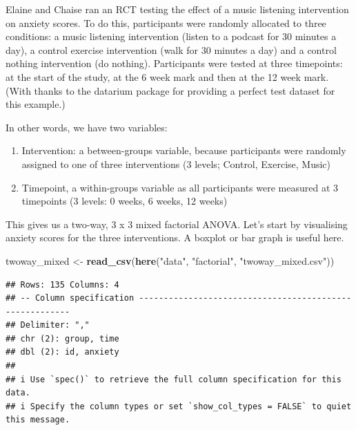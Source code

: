 \documentclass[
]{book}
\newenvironment{Shaded}{\begin{snugshade}}{\end{snugshade}}
\newcommand{\FunctionTok}[1]{\textcolor[rgb]{0.13,0.29,0.53}{\textbf{#1}}}
\newcommand{\NormalTok}[1]{#1}
\newcommand{\OtherTok}[1]{\textcolor[rgb]{0.56,0.35,0.01}{#1}}
\newcommand{\StringTok}[1]{\textcolor[rgb]{0.31,0.60,0.02}{#1}}
\providecommand{\tightlist}{%
  \setlength{\itemsep}{0pt}\setlength{\parskip}{0pt}}
\begin{document}
Elaine and Chaise ran an RCT testing the effect of a music listening intervention on anxiety scores. To do this, participants were randomly allocated to three conditions: a music listening intervention (listen to a podcast for 30 minutes a day), a control exercise intervention (walk for 30 minutes a day) and a control nothing intervention (do nothing). Participants were tested at three timepoints: at the start of the study, at the 6 week mark and then at the 12 week mark. (With thanks to the datarium package for providing a perfect test dataset for this example.)

In other words, we have two variables:

\begin{enumerate}
\def\labelenumi{\arabic{enumi}.}
\tightlist
\item
  Intervention: a between-groups variable, because participants were randomly assigned to one of three interventions (3 levels; Control, Exercise, Music)
\item
  Timepoint, a within-groups variable as all participants were measured at 3 timepoints (3 levels: 0 weeks, 6 weeks, 12 weeks)
\end{enumerate}

This gives us a two-way, 3 x 3 mixed factorial ANOVA. Let's start by visualising anxiety scores for the three interventions. A boxplot or bar graph is useful here.

\begin{Shaded}
\begin{Highlighting}[]
\NormalTok{twoway\_mixed }\OtherTok{\textless{}{-}} \FunctionTok{read\_csv}\NormalTok{(}\FunctionTok{here}\NormalTok{(}\StringTok{"data"}\NormalTok{, }\StringTok{"factorial"}\NormalTok{, }\StringTok{"twoway\_mixed.csv"}\NormalTok{))}
\end{Highlighting}
\end{Shaded}

\begin{verbatim}
## Rows: 135 Columns: 4
## -- Column specification --------------------------------------------------------
## Delimiter: ","
## chr (2): group, time
## dbl (2): id, anxiety
## 
## i Use `spec()` to retrieve the full column specification for this data.
## i Specify the column types or set `show_col_types = FALSE` to quiet this message.
\end{verbatim}
\end{document}
